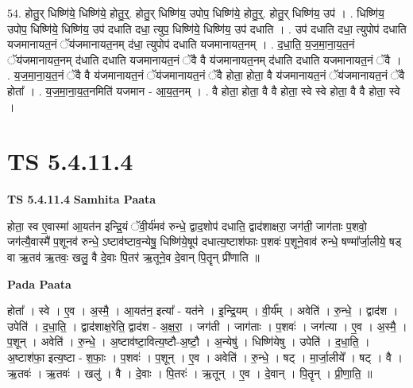 \documentclass[17pt]{extarticle}
\begin{document}
54. होतु॒र् धिष्णि॑ये॒ धिष्णि॑ये॒ होतु॒र्॒. होतु॒र् धिष्णि॑य॒ उपोप॒ धिष्णि॑ये॒ होतु॒र्॒. होतु॒र् धिष्णि॑य॒ उप॑ । . धिष्णि॑य॒ उपोप॒ धिष्णि॑ये॒ धिष्णि॑य॒ उप॑ दधाति दधा॒ त्युप॒ धिष्णि॑ये॒ धिष्णि॑य॒ उप॑ दधाति । . उप॑ दधाति दधा॒ त्युपोप॑ दधाति यजमानायत॒नं ॅय॑जमानायत॒नम् द॑धा॒ त्युपोप॑ दधाति यजमानायत॒नम् । . द॒धा॒ति॒ य॒ज॒मा॒ना॒य॒त॒नं ॅय॑जमानायत॒नम् द॑धाति दधाति यजमानायत॒नं ॅवै वै य॑जमानायत॒नम् द॑धाति दधाति यजमानायत॒नं ॅवै । . य॒ज॒मा॒ना॒य॒त॒नं ॅवै वै य॑जमानायत॒नं ॅय॑जमानायत॒नं ॅवै होता॒ होता॒ वै य॑जमानायत॒नं ॅय॑जमानायत॒नं ॅवै होता᳚ । . य॒ज॒मा॒ना॒य॒त॒नमिति॑ यजमान - आ॒य॒त॒नम् । . वै होता॒ होता॒ वै वै होता॒ स्वे स्वे होता॒ वै वै होता॒ स्वे । \newline
\pagebreak
{}

\section{ TS 5.4.11.4 }

\textbf{TS 5.4.11.4 } \newline
\textbf{Samhita Paata} \newline

होता॒ स्व ए॒वास्मा॑ आ॒यत॑न इन्द्रि॒यं ॅवी॒र्य॑मव॑ रुन्धे॒ द्वाद॒शोप॑ दधाति॒ द्वाद॑शाक्षरा॒ जग॑ती॒ जाग॑ताः प॒शवो॒ जग॑त्यै॒वास्मै॑ प॒शूनव॑ रुन्धे॒ ऽष्टाव॑ष्टाव॒न्येषु॒ धिष्णि॑ये॒षूप॑ दधात्य॒ष्टाश॑फाः प॒शवः॑ प॒शूने॒वाव॑ रुन्धे॒ षण्मा᳚र्जा॒लीये॒ षड् वा ऋ॒तव॑ ऋ॒तवः॒ खलु॒ वै दे॒वाः पि॒तर॑ ऋ॒तूने॒व दे॒वान् पि॒तॄन् प्री॑णाति ॥ \newline

\textbf{Pada Paata} \newline

होता᳚ । स्वे । ए॒व । अ॒स्मै॒ । आ॒यत॑न॒ इत्या᳚ - यत॑ने । इ॒न्द्रि॒यम् । वी॒र्य᳚म् । अवेति॑ । रु॒न्धे॒ । द्वाद॑श । उपेति॑ । द॒धा॒ति॒ । द्वाद॑शाक्ष॒रेति॒ द्वाद॑श - अ॒क्ष॒रा॒ । जग॑ती । जाग॑ताः । प॒शवः॑ । जग॑त्या । ए॒व । अ॒स्मै॒ । प॒शून् । अवेति॑ । रु॒न्धे॒ । अ॒ष्टाव॑ष्टा॒वित्य॒ष्टौ-अ॒ष्टौ॒ । अ॒न्येषु॑ । धिष्णि॑येषु । उपेति॑ । द॒धा॒ति॒ । अ॒ष्टाश॑फा॒ इत्य॒ष्टा - श॒फाः॒ । प॒शवः॑ । प॒शून् । ए॒व । अवेति॑ । रु॒न्धे॒ । षट् । मा॒र्जा॒लीये᳚ । षट् । वै । ऋ॒तवः॑ । ऋ॒तवः॑ । खलु॑ । वै । दे॒वाः । पि॒तरः॑ । ऋ॒तून् । ए॒व । दे॒वान् । पि॒तॄन् । प्री॒णा॒ति॒ ॥  \newline
\end{document}
